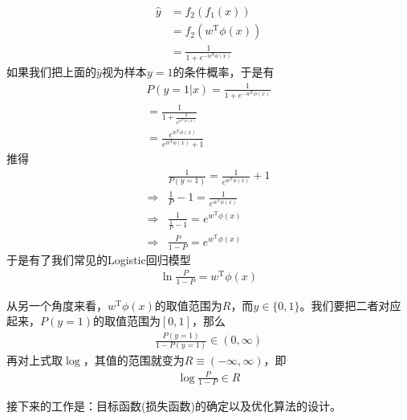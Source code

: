             \begin{align*}
            \hat{y} &= f_2(f_1(x))\\
            &= f_2(w^\mathrm{T}\phi(x))\\
            &= \frac{1}{1+e^{-w^\mathrm{T}\phi(x)}}
            \end{align*}
            如果我们把上面的$\hat{y}$视为样本$y=1$的条件概率，于是有
            \begin{align*}
            P(y=1|x) = \frac{1}{1+e^{-w^\mathrm{T}\phi(x)}}\\
            =\frac{1}{1+\frac{1}{e^{w^\mathrm{T}\phi(x)}}}\\
            =\frac{e^{w^\mathrm{T}\phi(x)}}{e^{w^\mathrm{T}\phi(x)}+1}
            \end{align*}
            推得
            \begin{align*}
            & \frac{1}{P(y=1)} = \frac{1}{e^{w^\mathrm{T}\phi(x)}}+1 \\
            \Rightarrow {}&\frac{1}{P}-1 = \frac{1}{e^{w^\mathrm{T}\phi(x)}} \\
            \Rightarrow {}&\frac{1}{\frac{1}{P}-1} = e^{w^\mathrm{T}\phi(x)}\\
            \Rightarrow {}&\frac{P}{1-P} = e^{w^\mathrm{T}\phi(x)}
            \end{align*}
            于是有了我们常见的Logistic回归模型
            \begin{align*}
            \ln \frac{P}{1-P} = w^\mathrm{T}\phi(x)
            \end{align*}
            \par
            从另一个角度来看，$w^\mathrm{T}\phi(x)$的取值范围为$R$，而$y\in \{0,1\}$。我们要把二者对应起来，$P(y=1)$的取值范围为$[0,1]$，那么
            \begin{align*}
            \frac{P(y=1)}{1-P(y=1)} \in (0,\infty)
            \end{align*}
            再对上式取$\log$，其值的范围就变为$R \equiv (-\infty,\infty)$，即
            \begin{align*}
            \log \frac{P}{1-P}  \in R
            \end{align*}
            \par
            接下来的工作是：目标函数(损失函数)的确定以及优化算法的设计。
